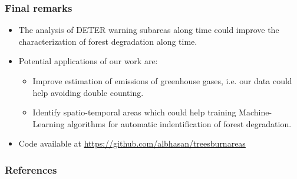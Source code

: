 \documentclass[aspectratio=169]{beamer}
\begin{document}
\begin{frame}
    \frametitle{Final remarks}
    \begin{itemize}
        \item The analysis of DETER warning subareas along time could improve 
            the characterization of forest degradation along time.
        \item Potential applications of our work are:
            \begin{itemize}
                \item Improve estimation of emissions of greenhouse gases, i.e.
                    our data could help avoiding double counting.
                \item Identify spatio-temporal areas which could help training 
                    Machine-Learning algorithms for automatic indentification 
                    of forest degradation.
            \end{itemize}
        \item Code available at 
            \url{https://github.com/albhasan/treesburnareas}
    \end{itemize}
\end{frame}

\begin{frame}[allowframebreaks]
    \frametitle{References}
    
    
\end{frame}
\end{document}
